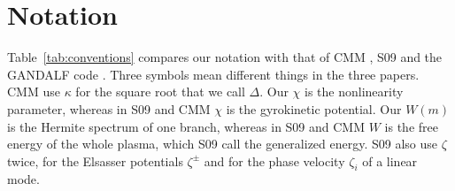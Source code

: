 \clearpage
\section{Notation}\label{app:notation}

Table~\ref{tab:conventions} compares our notation with that of CMM \citep{Chandran2026}, S09 \citep{Schekochihin2009} and the GANDALF code \citep{Kanekar2025}. Three symbols mean different things in the three papers. CMM use $\kappa$ for the square root that we call $\Delta$. Our $\chi$ is the nonlinearity parameter, whereas in S09 and CMM $\chi$ is the gyrokinetic potential. Our $W(m)$ is the Hermite spectrum of one branch, whereas in S09 and CMM $W$ is the free energy of the whole plasma, which S09 call the generalized energy. S09 also use $\zeta$ twice, for the Elsasser potentials $\zeta^\pm$ and for the phase velocity $\zeta_i$ of a linear mode.

